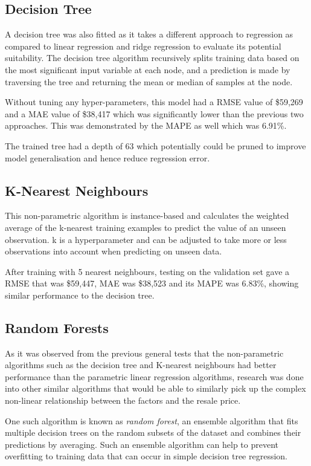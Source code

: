 \documentclass[[12pt,conference]{IEEEtran}
\begin{document}
\subsection{Decision Tree}
A decision tree was also fitted as it takes a different approach to regression as compared to linear regression and ridge regression to evaluate its potential suitability. The decision tree algorithm recursively splits training data based on the most significant input variable at each node, and a prediction is made by traversing the tree and returning the mean or median of samples at the node. 


Without tuning any hyper-parameters, this model had a RMSE value of \$59,269 and a MAE value of \$38,417 which was significantly lower than the previous two approaches. This was demonstrated by the MAPE as well which was 6.91\%.

The trained tree had a depth of 63 which potentially could be pruned to improve model generalisation and hence reduce regression error.

\subsection{K-Nearest Neighbours}
This non-parametric algorithm is instance-based and calculates the weighted average of the k-nearest training examples to predict the value of an unseen observation. k is a hyperparameter and can be adjusted to take more or less observations into account when predicting on unseen data.

After training with 5 nearest neighbours, testing on the validation set gave a RMSE that was \$59,447, MAE was \$38,523 and its MAPE was 6.83\%, showing similar performance to the decision tree.

\subsection{Random Forests}
As it was observed from the previous general tests that the non-parametric algorithms such as the decision tree and K-nearest neighbours had better performance than the parametric linear regression algorithms, research was done into other similar algorithms that would be able to similarly pick up the complex non-linear relationship between the factors and the resale price.

One such algorithm is known as \textit{random forest}, an ensemble algorithm that fits multiple decision trees on the random subsets of the dataset and combines their predictions by averaging. Such an ensemble algorithm can help to prevent overfitting to training data that can occur in simple decision tree regression. 
\end{document}
